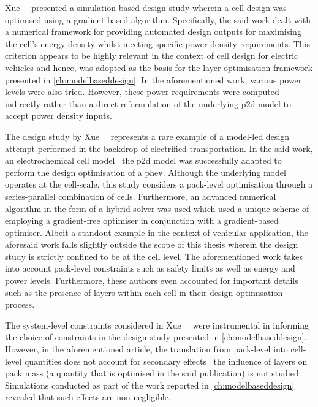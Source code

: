 Xue~\etal~\cite{Xue2013}  presented a  simulation based  design study  wherein a
cell design  was optimised using  a gradient-based algorithm.  Specifically, the
said  work dealt  with  a  numerical framework  for  providing automated  design
outputs for maximising  the cell's energy density whilst  meeting specific power
density  requirements. This  criterion  appears  to be  highly  relevant in  the
context of cell design for electric vehicles and hence, was adopted as the basis
for the layer optimisation framework presented in \cref{ch:modelbaseddesign}. In
the aforementioned  work, various power  levels were also tried.  However, these
power requirements were  computed indirectly rather than  a direct reformulation
of the underlying \gls{p2d} model to accept power density inputs.



The  design   study  by  Xue~\etal~\cite{Xue2014}  represents   a  rare  example
of  a  model-led  design  attempt  performed  in  the  backdrop  of  electrified
transportation.  In  the  said  work, an  electrochemical  cell  model  \viz~the
\gls{p2d} model was successfully adapted to perform the design optimisation of a
\gls{phev}. Although the underlying model operates at the cell-scale, this study
considers  a pack-level  optimisation through  a series-parallel  combination of
cells. Furthermore,  an advanced  numerical algorithm  in the  form of  a hybrid
solver  was  used which  used  a  unique  scheme  of employing  a  gradient-free
optimiser  in conjunction  with a  gradient-based optimiser.  Albeit a  standout
example  in the  context  of  vehicular application,  the  aforesaid work  falls
slightly outside the  scope of this thesis wherein the  design study is strictly
confined to  be at the  cell level. The  aforementioned work takes  into account
pack-level constraints such as safety limits as well as energy and power levels.
Furthermore,  these authors  even accounted  for important  details such  as the
presence of layers within each cell in their design optimisation process.

The  system-level   constraints  considered  in   Xue~\etal~\cite{Xue2014}  were
instrumental  in  informing  the  choice  of constraints  in  the  design  study
presented in \cref{ch:modelbaseddesign}. However, in the aforementioned article,
the translation from pack-level into  cell-level quantities does not account for
secondary effects \ie~the  influence of layers on pack mass  (a quantity that is
optimised in the said publication) is not studied. Simulations conducted as part
of the  work reported in  \cref{ch:modelbaseddesign} revealed that  such effects
are non-negligible.

